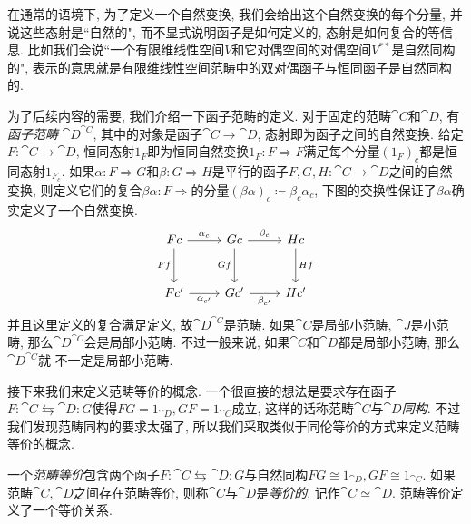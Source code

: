 在通常的语境下, 为了定义一个自然变换, 我们会给出这个自然变换的每个分量, 并说这些态射是``自然的", 而不显式说明函子是如何定义的, 态射是如何复合的等信息. 比如我们会说``一个有限维线性空间$V$和它对偶空间的对偶空间$V^{**}$是自然同构的", 表示的意思就是有限维线性空间范畴中的双对偶函子与恒同函子是自然同构的.


为了后续内容的需要, 我们介绍一下函子范畴的定义. 对于固定的范畴$\cat{C}$和$\cat{D}$, 有\emph{函子范畴} $\cat{D}^{\cat{C}}$, 其中的对象是函子$\cat{C}\to\cat{D}$, 态射即为函子之间的自然变换. 给定$F\colon \cat{C}\to \cat{D}$, 恒同态射$1_F$即为恒同自然变换$1_F\colon F\Rightarrow F$满足每个分量$(1_F)_c$都是恒同态射$1_{F_c}$. 如果$\alpha\colon F\Rightarrow G$和$\beta\colon G\Rightarrow H$是平行的函子$F, G, H\colon \cat{C}\to \cat{D}$之间的自然变换, 则定义它们的复合$\beta\alpha\colon F\Rightarrow$的分量$(\beta\alpha)_c\coloneq \beta_c\alpha_c$, 下图的交换性保证了$\beta\alpha$确实定义了一个自然变换\parencite[44, Lemma 1.7.1]{riehl_category_2017}.
\begin{equation*}
  \begin{tikzcd}[row sep=large]
    Fc & Gc & Hc\\
    Fc' & Gc' & Hc'
    \arrow[from=1-1,]{1-2}[above]{\alpha_c}
    \arrow[from=1-2,]{1-3}[above]{\beta_c}
    \arrow[from=2-1,]{2-2}[below]{\alpha_{c'}}
    \arrow[from=2-2,]{2-3}[below]{\beta_{c'}}
    \arrow[from=1-1,]{2-1}[left]{Ff}
    \arrow[from=1-2,]{2-2}[left]{Gf}
    \arrow[from=1-3,]{2-3}[right]{Hf}
  \end{tikzcd}
\end{equation*}
并且这里定义的复合满足定义\parencite[44, Corollary 1.7.2]{riehl_category_2017}, 故$\cat{D}^{\cat{C}}$是范畴. 如果$\cat{C}$是局部小范畴, $\cat{J}$是小范畴, 那么$\cat{D}^{\cat{C}}$会是局部小范畴. 不过一般来说, 如果$\cat{C}$和$\cat{D}$都是局部小范畴, 那么$\cat{D}^{\cat{C}}$就
不一定是局部小范畴.

接下来我们来定义范畴等价的概念. 一个很直接的想法是要求存在函子$F\colon \cat{C}\leftrightarrows \cat{D}\colon G$使得$FG=1_{\cat{D}}, GF=1_{\cat{C}}$成立, 这样的话称范畴$\cat{C}$与$\cat{D}$\emph{同构}. 不过我们发现范畴同构的要求太强了\parencite[21]{riehl_category_2017}, 所以我们采取类似于同伦等价的方式来定义范畴等价的概念.

一个\emph{范畴等价}包含两个函子$F\colon \cat{C}\leftrightarrows \cat{D}\colon G$与自然同构$FG\cong 1_{\cat{D}}, GF\cong 1_{\cat{C}}$. 如果范畴$\cat{C}, \cat{D}$之间存在范畴等价, 则称$\cat{C}$与$\cat{D}$是\emph{等价的}, 记作$\cat{C}\simeq\cat{D}$. 范畴等价定义了一个等价关系\parencite[30, Lemma 1.5.5]{riehl_category_2017}.

